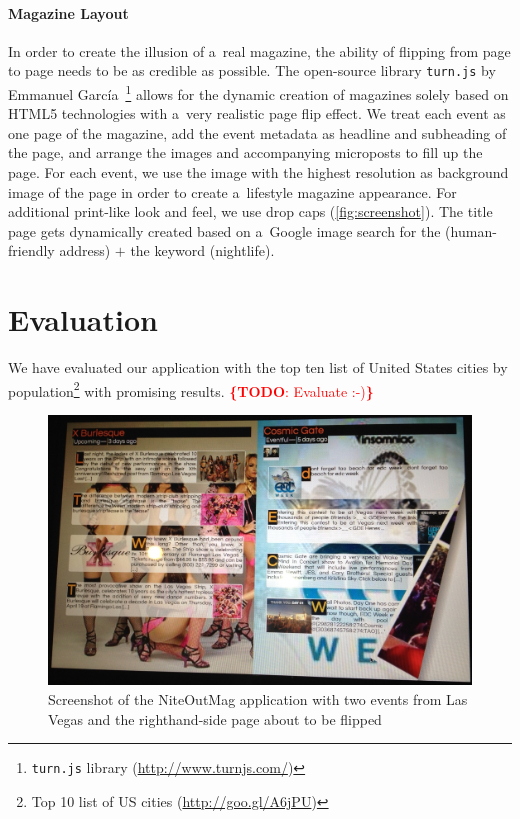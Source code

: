 \documentclass[runningheads,a4paper]{llncs}
\newcommand{\todo}[1]{\noindent\textcolor{red}{{\bf \{TODO}: #1{\bf \}}}}
\begin{document}
{\paragraph{Magazine Layout}
In order to create the illusion of a~real magazine, the ability of flipping from page to page needs to be as credible as possible. The open-source library \texttt{turn.js} by Emmanuel García~\footnote{\texttt{turn.js} library (\url{http://www.turnjs.com/})} allows for the dynamic creation of magazines solely based on HTML5 technologies with a~very realistic page flip effect. We treat each event as one page of the magazine, add the event metadata as headline and subheading of the page, and arrange the images and accompanying microposts to fill up the page. For each event, we use the image with the highest resolution as background image of the page in order to create a~lifestyle magazine appearance. For additional print-like look and feel, we use drop caps (\autoref{fig:screenshot}). The title page gets dynamically created based on a~Google image search for the (human-friendly address) $+$ the keyword (nightlife).


\section{Evaluation}                                                       \label{sec:experiments}
We have evaluated our application with the top ten list of United States cities by population\footnote{Top 10 list of US cities (\url{http://goo.gl/A6jPU})} with promising results.
\todo{Evaluate :-)}

\begin{figure}[b!]
\centering
\includegraphics[width=1.0\columnwidth]{./screenshot.jpg}
\caption{Screenshot of the NiteOutMag application with two events from Las Vegas and the righthand-side page about to be flipped}
\label{fig:screenshot}
\end{figure}

}
\end{document}
